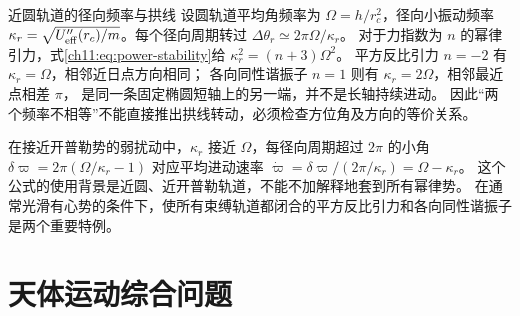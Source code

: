 \begingroup{}\begin{starread}{近圆轨道的径向频率与拱线}
\label{ch11:sec:precession}
设圆轨道平均角频率为 $\Omega=h/r_c^2$，径向小振动频率
$\kappa_r=\sqrt{U_{\rm eff}''(r_c)/m}$。每个径向周期转过
$\Delta\theta_r\simeq2\pi\Omega/\kappa_r$。
对于力指数为 $n$ 的幂律引力，式\eqref{ch11:eq:power-stability}给
$\kappa_r^2=(n+3)\Omega^2$。
平方反比引力 $n=-2$ 有 $\kappa_r=\Omega$，相邻近日点方向相同；
各向同性谐振子 $n=1$ 则有 $\kappa_r=2\Omega$，相邻最近点相差 $\pi$，
是同一条固定椭圆短轴上的另一端，并不是长轴持续进动。
因此“两个频率不相等”不能直接推出拱线转动，必须检查方位角及方向的等价关系。

在接近开普勒势的弱扰动中，$\kappa_r$ 接近 $\Omega$，每径向周期超过 $2\pi$ 的小角
$\delta\varpi=2\pi(\Omega/\kappa_r-1)$ 对应平均进动速率
$\dot\varpi=\delta\varpi/(2\pi/\kappa_r)=\Omega-\kappa_r$。
这个公式的使用背景是近圆、近开普勒轨道，不能不加解释地套到所有幂律势。
在通常光滑有心势的条件下，使所有束缚轨道都闭合的平方反比引力和各向同性谐振子是两个重要特例。
\end{starread}\endgroup

\section{天体运动综合问题}

